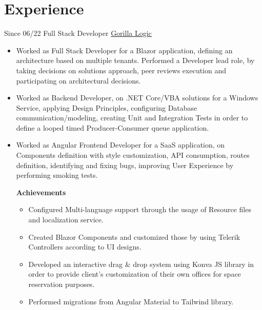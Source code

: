 \documentclass[letterpaper]{twentysecondcv} %
\begin{document}
\section{Experience}
    \begin{twenty}
        \twentyitem
        {Since 06/22}
        {Full Stack Developer}
        { \href{https://gorillalogic.com/}{Gorilla Logic} }
        {
            \begin{itemize}
                \item Worked as Full Stack Developer for a Blazor application, defining an architecture based on multiple tenants. Performed a Developer lead role, by taking decisions on solutions approach, peer reviews execution and participating on architectural decisions.

                \item Worked as Backend Developer, on .NET Core/VBA solutions for a Windows Service, applying Design Principles, configuring Database communication/modeling, creating Unit and Integration Tests in order to define a looped timed Producer-Consumer queue application.
                    
                \item Worked as Angular Frontend Developer for a SaaS application, on Components definition with style customization, API consumption, routes definition, identifying and fixing bugs, improving User Experience by performing smoking tests.

                \textbf{Achievements}
                \begin{itemize}
                    \item Configured Multi-language support through the usage of Resource files and localization service.
                
                    \item Created Blazor Components and customized those by using Telerik Controllers according to UI designs.
                
                    \item Developed an interactive drag \& drop system using Konva JS library in order to provide client's customization of their own offices for space reservation purposes.

                    \item Performed migrations from Angular Material to Tailwind library.
                \end{itemize}
            

\end{itemize}}
\end{twenty}
\end{document}
